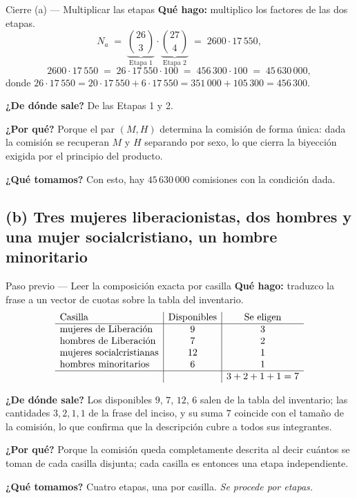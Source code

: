 \documentclass[11pt]{article}
\begin{document}
\begin{paso}{Cierre (a) --- Multiplicar las etapas}
\textbf{Qu\'e hago:} multiplico los factores de las dos etapas.
\[
N_a\;=\;\underbrace{\binom{26}{3}}_{\text{Etapa 1}}\cdot\underbrace{\binom{27}{4}}_{\text{Etapa 2}}
\;=\;2600\cdot 17\,550 ,
\]
\[
2600\cdot 17\,550\;=\;26\cdot 17\,550\cdot 100\;=\;456\,300\cdot 100\;=\;45\,630\,000 ,
\]
donde $26\cdot 17\,550 = 20\cdot 17\,550 + 6\cdot 17\,550 = 351\,000+105\,300 = 456\,300$.

\textbf{¿De d\'onde sale?} De las Etapas 1 y 2.

\textbf{¿Por qu\'e?} Porque el par $(M,H)$ determina la comisi\'on de forma \'unica: dada la comisi\'on se
recuperan $M$ y $H$ separando por sexo, lo que cierra la biyecci\'on exigida por el principio del producto.

\textbf{¿Qu\'e tomamos?} Con esto, hay $45\,630\,000$ comisiones con la condici\'on dada.
\end{paso}

\subsection*{(b) Tres mujeres liberacionistas, dos hombres y una mujer socialcristiano, un hombre minoritario}

\begin{paso}{Paso previo --- Leer la composici\'on exacta por casilla}
\textbf{Qu\'e hago:} traduzco la frase a un vector de cuotas sobre la tabla del inventario.
\[
\begin{array}{l|c|c}
\text{Casilla} & \text{Disponibles} & \text{Se eligen}\\ \hline
\text{mujeres de Liberaci\'on} & 9 & 3\\
\text{hombres de Liberaci\'on} & 7 & 2\\
\text{mujeres socialcristianas} & 12 & 1\\
\text{hombres minoritarios} & 6 & 1\\ \hline
& & 3+2+1+1=7
\end{array}
\]

\textbf{¿De d\'onde sale?} Los disponibles $9$, $7$, $12$, $6$ salen de la tabla del inventario; las
cantidades $3,2,1,1$ de la frase del inciso, y su suma $7$ coincide con el tama\~no de la comisi\'on, lo que
confirma que la descripci\'on cubre a todos sus integrantes.

\textbf{¿Por qu\'e?} Porque la comisi\'on queda completamente descrita al decir cu\'antos se toman de cada
casilla disjunta; cada casilla es entonces una etapa independiente.

\textbf{¿Qu\'e tomamos?} Cuatro etapas, una por casilla. \emph{Se procede por etapas.}
\end{paso}
\end{document}
